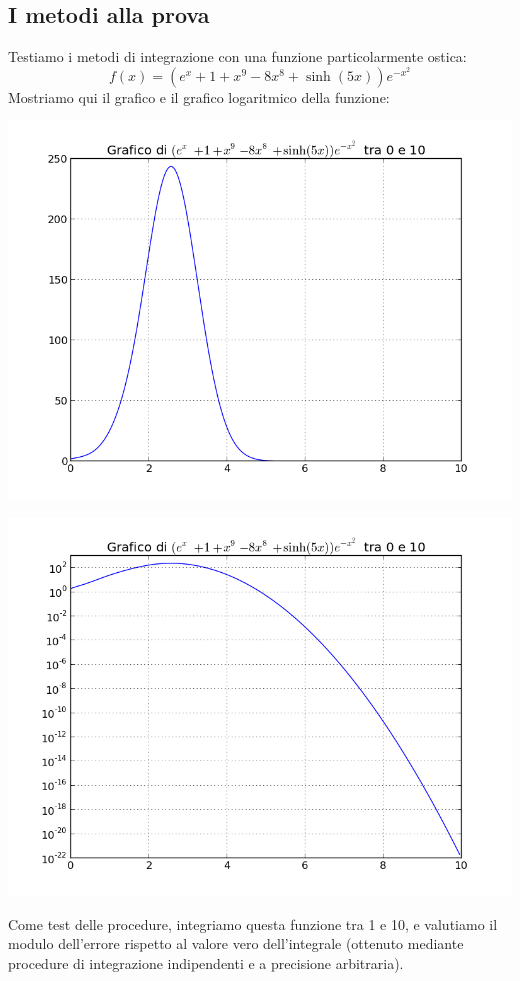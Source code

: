 \documentclass[a4paper,10pt]{article}
\begin{document}
\subsection{I metodi alla prova}
Testiamo i metodi di integrazione con una funzione particolarmente ostica:
$$f(x) = (e^x+1+x^9-8x^8+\sinh(5x))e^{-x^2}$$
Mostriamo qui il grafico e il grafico logaritmico della funzione:
\begin{center}
\includegraphics[scale=0.5]{../images/funzione-integranda.png}
\end{center}
\begin{center}
\includegraphics[scale=0.5]{../images/funzione-integranda-log.png}
\end{center}
Come test delle procedure, integriamo questa funzione tra 1 e 10, e valutiamo il modulo dell'errore rispetto al valore vero dell'integrale (ottenuto mediante procedure di integrazione indipendenti e a precisione arbitraria).
\end{document}
